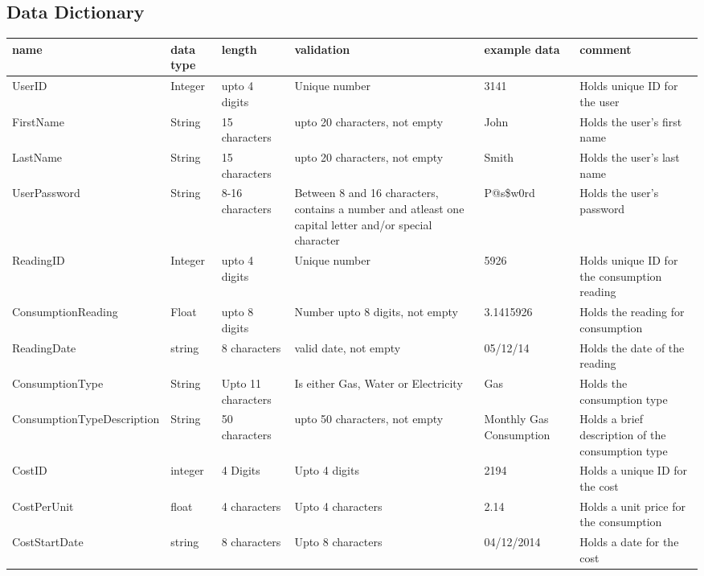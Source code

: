 \subsection{Data Dictionary}
\begin{center}
\begin{tabular}{|p{4.3cm}|p{1cm}|p{1.5cm}|p{3cm}|p{1.5cm}|p{2.5cm}|}
	\hline
	\textbf{name} & \textbf{data type} & \textbf{length} & \textbf{validation} & \textbf{example data} & \textbf{comment} \\ \hline
	UserID & Integer & upto 4 digits & Unique number & 3141 & Holds unique ID for the user \\ \hline
	FirstName & String & 15 characters & upto 20 characters, not empty & John & Holds the user's first name \\ \hline
	LastName & String & 15 characters & upto 20 characters, not empty & Smith & Holds the user's last name \\ \hline
	UserPassword & String & 8-16 characters & Between 8 and 16 characters, contains a number and atleast one capital letter and/or special character & P@s\$w0rd & Holds the user's password \\ \hline
	ReadingID & Integer & upto 4 digits & Unique number & 5926 & Holds unique ID for the consumption reading \\ \hline
	ConsumptionReading & Float & upto 8 digits & Number upto 8 digits, not empty & 3.1415926 & Holds the reading for consumption \\ \hline
	ReadingDate & string & 8 characters & valid date, not empty & 05/12/14 & Holds the date of the reading \\ \hline
	ConsumptionType & String & Upto 11 characters & Is either Gas, Water or Electricity & Gas & Holds the consumption type \\ \hline
	ConsumptionTypeDescription & String & 50 characters & upto 50 characters, not empty & Monthly Gas Consumption & Holds a brief description of the consumption type \\ \hline
	CostID & integer & 4 Digits & Upto 4 digits & 2194 & Holds a unique ID for the cost \\ \hline
	CostPerUnit & float & 4 characters & Upto 4 characters & 2.14 & Holds a unit price for the consumption \\ \hline
	CostStartDate & string & 8 characters & Upto 8 characters & 04/12/2014 & Holds a date for the cost \\ \hline
\end{tabular}
\end{center}
